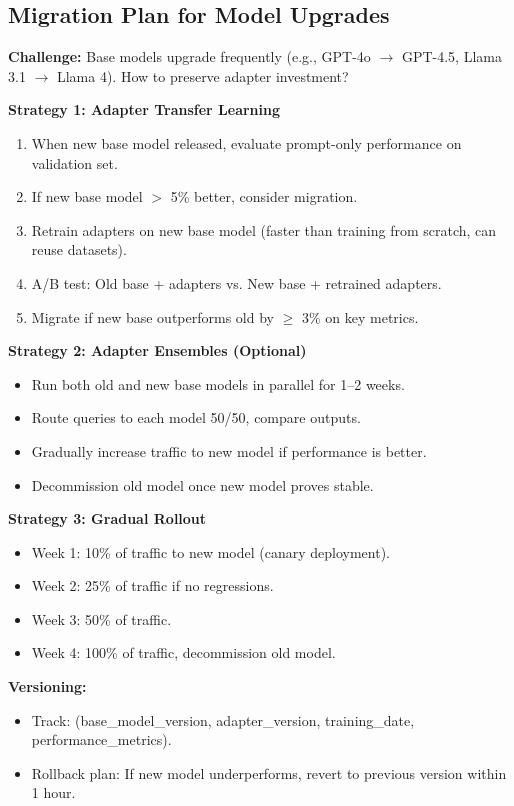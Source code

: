 \documentclass[11pt,letterpaper]{article}
\begin{document}
\subsection{Migration Plan for Model Upgrades}

\textbf{Challenge:} Base models upgrade frequently (e.g., GPT-4o $\rightarrow$ GPT-4.5, Llama 3.1 $\rightarrow$ Llama 4). How to preserve adapter investment?

\textbf{Strategy 1: Adapter Transfer Learning}
\begin{enumerate}
\item When new base model released, evaluate prompt-only performance on validation set.
\item If new base model $>$ 5\% better, consider migration.
\item Retrain adapters on new base model (faster than training from scratch, can reuse datasets).
\item A/B test: Old base + adapters vs. New base + retrained adapters.
\item Migrate if new base outperforms old by $\geq$ 3\% on key metrics.
\end{enumerate}

\textbf{Strategy 2: Adapter Ensembles (Optional)}
\begin{itemize}
\item Run both old and new base models in parallel for 1--2 weeks.
\item Route queries to each model 50/50, compare outputs.
\item Gradually increase traffic to new model if performance is better.
\item Decommission old model once new model proves stable.
\end{itemize}

\textbf{Strategy 3: Gradual Rollout}
\begin{itemize}
\item Week 1: 10\% of traffic to new model (canary deployment).
\item Week 2: 25\% of traffic if no regressions.
\item Week 3: 50\% of traffic.
\item Week 4: 100\% of traffic, decommission old model.
\end{itemize}

\textbf{Versioning:}
\begin{itemize}
\item Track: (base\_model\_version, adapter\_version, training\_date, performance\_metrics).
\item Rollback plan: If new model underperforms, revert to previous version within 1 hour.
\end{itemize}
\end{document}
